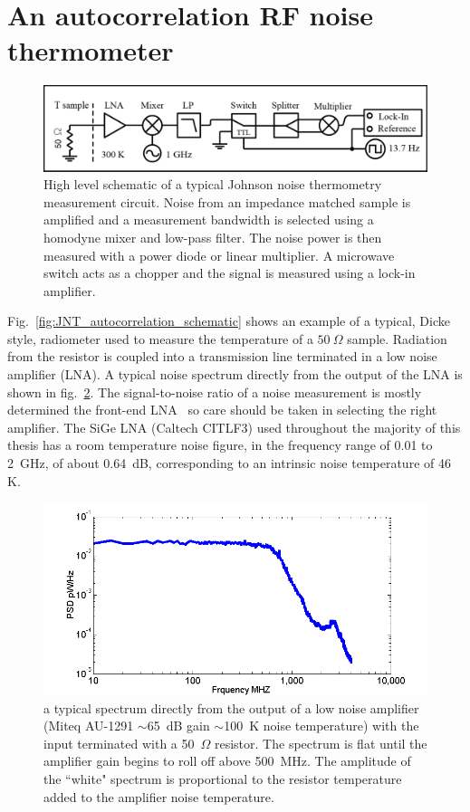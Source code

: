 \section{An autocorrelation RF noise thermometer}
\begin{figure}
\centering
\includegraphics[width=\textwidth]{figures/Johnson_noise_thermometry/Schematic_Autocorrelation.png}
\caption[JNT autocorrelation schematic]{High level schematic of a typical Johnson noise thermometry measurement circuit. Noise from an impedance matched sample is amplified and a measurement bandwidth is selected using a homodyne mixer and low-pass filter. The noise power is then measured with a power diode or linear multiplier. A microwave switch acts as a chopper and the signal is measured using a lock-in amplifier.}
\label{fig:schematic_autocorrelation}
\end{figure}

Fig.~\ref{fig:JNT_autocorrelation_schematic} shows an example of a typical, Dicke style, radiometer used to measure the temperature of a $50~\Omega$ sample. Radiation from the resistor is coupled into a transmission line terminated in a low noise amplifier (LNA). A typical noise spectrum directly from the output of the LNA is shown in fig.~\ref{fig:Miteq_spec}. The signal-to-noise ratio of a noise measurement is mostly determined the front-end LNA~\cite{pozar_microwave_2011} so care should be taken in selecting the right amplifier. The SiGe LNA (Caltech CITLF3) used throughout the majority of this thesis has a room temperature noise figure, in the frequency range of 0.01 to 2~GHz, of about 0.64~dB, corresponding to an intrinsic noise temperature of 46 K.
\begin{figure}
\includegraphics[width=\textwidth]{figures/Johnson_noise_thermometry/Miteq_spec.png}
\caption{a typical spectrum directly from the output of a low noise amplifier (Miteq AU-1291 $\sim$65~dB gain $\sim$100~K noise temperature) with the input terminated with a 50~$\Omega$ resistor. The spectrum is flat until the amplifier gain begins to roll off above 500~MHz. The amplitude of the ``white" spectrum is proportional to the resistor temperature added to the amplifier noise temperature.}
\label{fig:Miteq_spec}
\end{figure}


